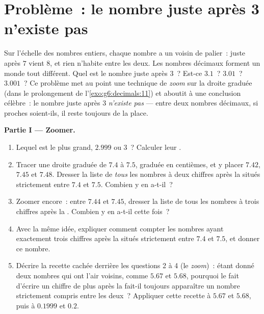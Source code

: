 \section{Problème~: le nombre juste après 3 n'existe pas}

\begin{problem}
\label{pb:g6:decimals:1}
Sur l'échelle des nombres entiers, chaque nombre a un voisin de
palier~: juste après $7$ vient $8$, et rien n'habite entre les deux.
Les nombres décimaux forment un monde tout différent. Quel est le
nombre juste après $3$~? Est-ce $3.1$~? $3.01$~? $3.001$~? Ce
problème met au point une technique de \emph{zoom} sur la droite
graduée (dans le prolongement de l'\cref{exo:g6:decimals:11}) et
aboutit à une conclusion célèbre~: le nombre juste après $3$
\emph{n'existe pas} --- entre deux nombres décimaux, si proches
soient-ils, il reste toujours de la place.

\medskip
\noindent\textbf{Partie I --- Zoomer.}
\begin{enumerate}
  \item Lequel est le plus grand, $2.999$ ou $3$~? Calculer leur
        .
  \item Tracer une droite graduée de $7.4$ à $7.5$, graduée en
        centièmes, et y placer $7.42$, $7.45$ et $7.48$. Dresser la
        liste de \emph{tous} les nombres à deux chiffres après la
         situés strictement entre $7.4$ et $7.5$. Combien y
        en a-t-il~?
  \item Zoomer encore~: entre $7.44$ et $7.45$, dresser la liste de
        tous les nombres à trois chiffres après la . Combien
        y en a-t-il cette fois~?
  \item Avec la même idée, expliquer comment compter les nombres
        ayant exactement trois chiffres après la  situés
        strictement entre $7.4$ et $7.5$, et donner ce nombre.
  \item Décrire la recette cachée derrière les questions 2 à 4 (le
        \emph{zoom})~: étant donné deux nombres qui ont l'air
        voisins, comme $5.67$ et $5.68$, pourquoi le fait d'écrire un
        chiffre de plus après la  fait-il toujours apparaître
        un nombre strictement compris entre les deux~? Appliquer
        cette recette à $5.67$ et $5.68$, puis à $0.1999$ et $0.2$.
\end{enumerate}


\end{problem}
